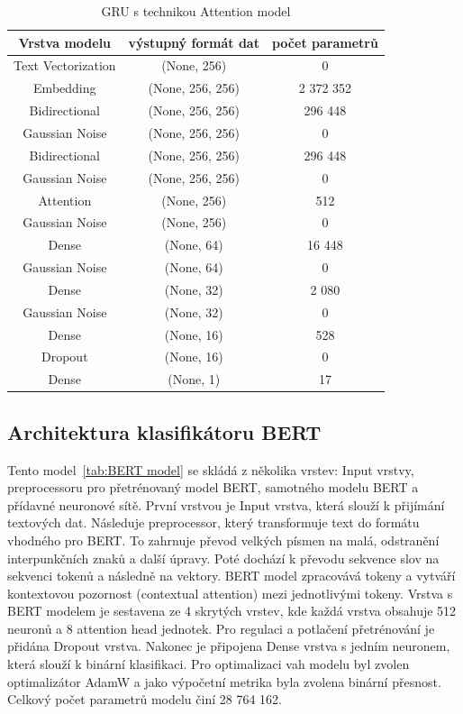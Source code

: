 \begin{table}[H]
	\centering
	\caption{GRU s technikou Attention model}\label{tab:GRU Attention model}
	\begin{tabular}{ c c c }
			\toprule
			Vrstva modelu & výstupný formát dat & počet parametrů\\
			\midrule
            Text Vectorization & (None, 256) & 0\\         
            Embedding & (None, 256, 256) & 2 372 352\\   
            Bidirectional & (None, 256, 256) & 296 448\\    
			Gaussian Noise & (None, 256, 256) & 0\\
            Bidirectional & (None, 256, 256) & 296 448\\
			Gaussian Noise & (None, 256, 256) & 0\\
			Attention & (None, 256) & 512\\
			Gaussian Noise & (None, 256) & 0\\
            Dense & (None, 64) & 16 448\\ 
			Gaussian Noise & (None, 64) & 0\\
			Dense & (None, 32) & 2 080\\ 
			Gaussian Noise & (None, 32) & 0\\
			Dense & (None, 16) & 528\\ 
            Dropout & (None, 16) & 0\\   
            Dense & (None, 1) & 17\\ 
			\midrule
		\end{tabular}
\end{table}

\subsection{Architektura klasifikátoru BERT}\label{arch: BERT}
Tento model~\ref{tab:BERT model} se skládá z několika vrstev: Input vrstvy, preprocessoru pro přetrénovaný model BERT, samotného modelu BERT a přídavné neuronové sítě.
První vrstvou je Input vrstva, která slouží k přijímání textových dat.
Následuje preprocessor, který transformuje text do formátu vhodného pro BERT.\@
To zahrnuje převod velkých písmen na malá, odstranění interpunkčních znaků a další úpravy.
Poté dochází k převodu sekvence slov na sekvenci tokenů a následně na vektory.
BERT model zpracovává tokeny a vytváří kontextovou pozornost (contextual attention) mezi jednotlivými tokeny.
Vrstva s BERT modelem je sestavena ze 4 skrytých vrstev, kde každá vrstva obsahuje 512 neuronů a 8 attention head jednotek. 
Pro regulaci a potlačení přetrénování je přidána Dropout vrstva.
Nakonec je připojena Dense vrstva s jedním neuronem, která slouží k binární klasifikaci.
Pro optimalizaci vah modelu byl zvolen optimalizátor AdamW a jako výpočetní metrika byla zvolena binární přesnost. 
Celkový počet parametrů modelu činí 28 764 162.

